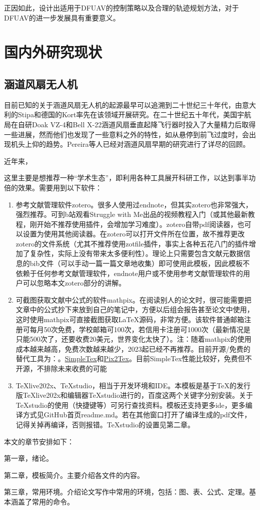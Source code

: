 正因如此，设计出适用于DFUAV的控制策略以及合理的轨迹规划方法，对于DFUAV的进一步发展具有重要意义。

\section{国内外研究现状}

\subsection{涵道风扇无人机}

目前已知的关于涵道风扇无人机的起源最早可以追溯到二十世纪三十年代，由意大利的Stipa和德国的Kort率先在该领域开展研究\cite{iiiNondimensionalModelingDuctedFan2012}。在二十世纪五十年代，美国宇航局在自研Doak VZ-4和Bell X-22涵道风扇垂直起降飞行器时投入了大量精力后取得一些进展，然而他们也发现了一些意料之外的特性，如从悬停到前飞过度时，会出现机头上仰的趋势\cite{cookSummaryLiftLift1993}。Pereira等人\cite{pereiraHoverWindtunnelTesting2008}已经对涵道风扇早期的研究进行了详尽的回顾。

近年来，


这里主要是想推荐一种“学术生态”，即利用各种工具展开科研工作，以达到事半功倍的效果。需要用到以下软件：
\begin{enumerate}[topsep = 0 pt, itemsep= 0 pt, parsep=0pt, partopsep=0pt, leftmargin=44pt, itemindent=0pt, labelsep=6pt, label=(\arabic*)]
	\item 	参考文献管理软件zotero\cite{_m}。很多人使用过endnote，但其实zotero也非常强大，强烈推荐。可到b站观看Struggle with Me出品的视频教程\cite{_k}入门（或其他最新教程，刚开始不推荐使用插件，会增加学习难度）。zotero自带pdf阅读器，也可以设置为使用其他阅读器。在zotero可以打开文件所在位置，故不推荐更改zotero的文件系统（尤其不推荐使用zotfile插件，事实上各种五花八门的插件增加了复杂性，实际上没有带来太多便利性）。理论上只需要包含文献元数据信息的bib文件（可以手动一篇一篇文章地收集）即可使用此模板，因此模板不依赖于任何参考文献管理软件，endnote用户或不使用参考文献管理软件的用户可以忽略本文zotero部分的讲解。
	\item	可截图获取文献中公式的软件mathpix\cite{_h}。在阅读别人的论文时，很可能需要把文章中的公式抄下来放到自己的笔记中，方便以后组会报告甚至论文中使用，这时使用mathpix可直接截图获取\LaTeX{}源码，非常方便。该软件普通邮箱注册可每月50次免费，学校邮箱可100次，若信用卡注册可1000次（最新情况是只能500次了，还要收费20美元，世界变化太快了）。注：随着mathpix的使用成本越来越高，免费次数越来越少，2023起已经不再推荐。目前开源/免费的替代工具为：。\href{https://www.simpletex.cn/}{SimpleTex}和\href{https://p2t.breezedeus.com/}{Pix2Tex}。目前SimpleTex性能比较好，免费但不开源，不排除未来收费的可能
	\item	TeXlive202x、TeXstudio，相当于开发环境和IDE。本模板是基于TeX的发行版TeXlive202x和编辑器TeXstudio进行的，百度这两个关键字分别安装。关于TeXstudio的使用（快捷键等）可另行查找资料。模板还支持更多ide，更多编译方式见GitHub首页readme.md。若在其他窗口打开了编译生成的pdf文件，记得关掉再编译，否则报错。TeXstudio的设置见第二章。
\end{enumerate}

本文的章节安排如下：

第一章，绪论。

第二章，模板简介。主要介绍各文件的内容。

第三章，常用环境。介绍论文写作中常用的环境，包括：图、表、公式、定理。基本涵盖了常用的命令。



